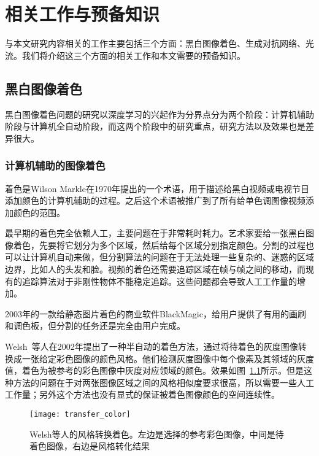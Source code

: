 \chapter{相关工作与预备知识}
\label{cha:related}

  与本文研究内容相关的工作主要包括三个方面：黑白图像着色、生成对抗网络、光流。我们将介绍这三个方面的相关工作和本文需要的预备知识。

\section{黑白图像着色}
\label{sec:image-color}

  黑白图像着色问题的研究以深度学习的兴起作为分界点分为两个阶段：计算机辅助阶段与计算机全自动阶段，而这两个阶段中的研究重点，研究方法以及效果也是差异很大。

\subsection{计算机辅助的图像着色}
\label{sec:user-guided-color}
  
  着色是Wilson Markle在1970年提出的一个术语，用于描述给黑白视频或电视节目添加颜色的计算机辅助的过程。之后这个术语被推广到了所有给单色调图像视频添加颜色的范围。

  最早期的着色完全依赖人工，主要问题在于非常耗时耗力。艺术家要给一张黑白图像着色，先要将它划分为多个区域，然后给每个区域分别指定颜色。分割的过程也可以让计算机自动来做，但分割算法的问题在于无法处理一些复杂的、迷惑的区域边界，比如人的头发和脸。视频的着色还需要追踪区域在帧与帧之间的移动，而现有的追踪算法对于非刚性物体不能稳定追踪。这些问题都会导致人工工作量的增加。

  2003年的一款给静态图片着色的商业软件BlackMagic，给用户提供了有用的画刷和调色板，但分割的任务还是完全由用户完成。

  Welsh~\cite{DBLP:journals/tog/WelshAM02}等人在2002年提出了一种半自动的着色方法，通过将待着色的灰度图像转换成一张给定彩色图像的颜色风格。他们检测灰度图像中每个像素及其领域的灰度值，着色为被参考的彩色图像中灰度对应领域的颜色。效果如图~\ref{fig:transfer}所示。但是这种方法的问题在于对两张图像区域之间的风格相似度要求很高，所以需要一些人工工作量；另外这个方法也没有显式的保证被着色图像颜色的空间连续性。

  \begin{figure}[H]
    \centering
    \texttt{[image: transfer\_color]}
    \caption{Welsh等人的风格转换着色。左边是选择的参考彩色图像，中间是待着色图像，右边是风格转化结果}
    \label{fig:transfer}
  \end{figure}


